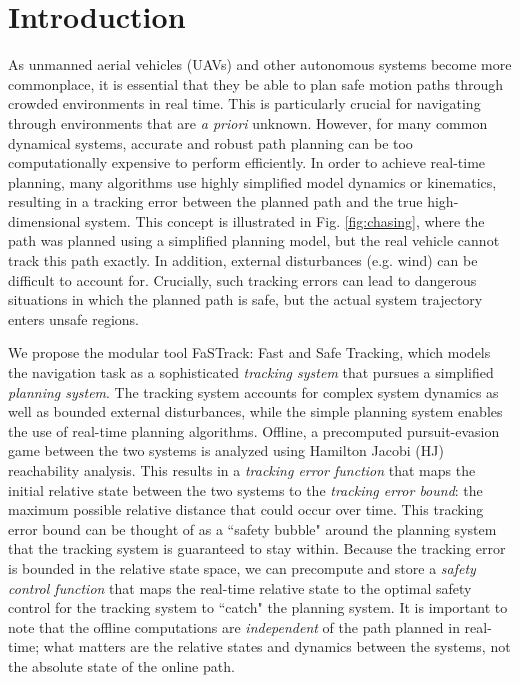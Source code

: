 \section{Introduction}
 As unmanned aerial vehicles (UAVs) and other autonomous systems become more commonplace, it is essential that they be able to plan safe motion paths through crowded environments in real time. This is particularly crucial for navigating through environments that are \textit{a priori} unknown. However, for many common dynamical systems, accurate and robust path planning can be too computationally expensive to perform efficiently. In order to achieve real-time planning, many algorithms use highly simplified model dynamics or kinematics, resulting in a tracking error between the planned path and the true high-dimensional system. This concept is illustrated in Fig. \ref{fig:chasing}, where the path was planned using a simplified planning model, but the real vehicle cannot track this path exactly. In addition, external disturbances (e.g. wind) can be difficult to account for. Crucially, such tracking errors can lead to dangerous situations in which the planned path is safe, but the actual system trajectory enters unsafe regions.
 


We propose the modular tool FaSTrack: Fast and Safe Tracking, which models the navigation task as a sophisticated \textit{tracking system} that pursues a simplified \textit{planning system}. The tracking system accounts for complex system dynamics as well as bounded external disturbances, while the simple planning system enables the use of real-time planning algorithms. Offline, a precomputed pursuit-evasion game between the two systems is analyzed using Hamilton Jacobi (HJ) reachability analysis. This results in a \textit{tracking error function} that maps the initial relative state between the two systems to the \textit{tracking error bound}: the maximum possible relative distance that could occur over time. This tracking error bound can be thought of as a ``safety bubble" around the planning system that the tracking system is guaranteed to stay within. Because the tracking error is bounded in the relative state space, we can precompute and store a \textit{safety control function} that  maps the real-time relative state to the optimal safety control for the tracking system to ``catch" the planning system. It is important to note that the offline computations are \textit{independent} of the path planned in real-time; what matters are the relative states and dynamics between the systems, not the absolute state of the online path.


